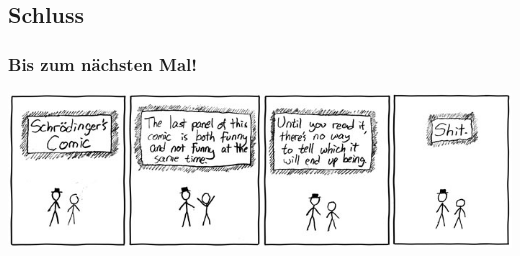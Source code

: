 \subsection{Schluss}

\begin{frame}
\frametitle{Bis zum nächsten Mal!}
\begin{center}
  \includegraphics[width=1.5 \textheight]{images/schrodinger.jpg}
\end{center}
\end{frame}

